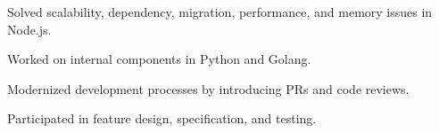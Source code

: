 \documentclass[a4paper,11pt]{article}
\begin{document}
\begin{sectionList}
\begin{jobReflectizLead}



    \end{jobReflectizLead}

    \begin{jobAppdome}
        \item Solved scalability, dependency, migration, performance, and memory issues in Node.js.
        \item Worked on internal components in Python and Golang.
        \item Modernized development processes by introducing PRs and code reviews.
        \item Participated in feature design, specification, and testing.
    \end{jobAppdome}


\end{sectionList}
\end{document}
